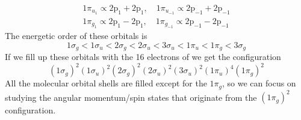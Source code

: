 \documentclass[../Main/chem532-notes.tex]{subfiles}
\begin{document}
\begin{example}
\begin{equation}
\begin{split}
1\pi_{u_1}  \propto \mathrm{2p_1 + 2p_1}, \quad 1\pi_{u_{-1}}  \propto \mathrm{2p_{-1} + 2p_{-1}} \\
1\pi_{g_1}  \propto \mathrm{2p_1 - 2p_1}, \quad 1\pi_{g_{-1}}  \propto \mathrm{2p_{-1} - 2p_{-1}}
\end{split}
\end{equation}
The energetic order of these orbitals is
\begin{equation}
1\sigma_g < 1\sigma_u < 2\sigma_g < 2\sigma_u <
3\sigma_u < 1\pi_u < 1\pi_g < 3\sigma_g
\end{equation}
If we fill up these orbitals with the 16 electrons of  we get the configuration
\begin{equation}
(1\sigma_g)^2 (1\sigma_u)^2 (2\sigma_g)^2 (2\sigma_u)^2
(3\sigma_u)^2 (1\pi_u)^4 (1\pi_g)^2
\end{equation}
All the molecular orbital shells are filled except for the $1\pi_g$, so we can focus on studying the angular momentum/spin states that originate from the $(1\pi_g)^2$ configuration.


\end{example}
\end{document}
